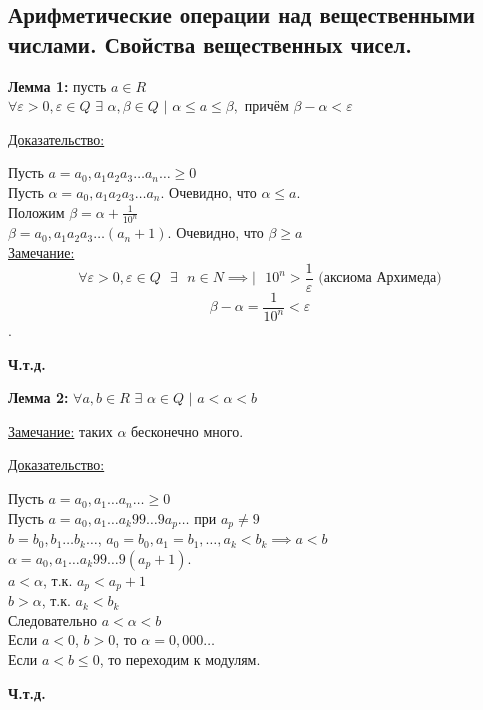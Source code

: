 \documentclass[12pt]{article}
\begin{document}
    \subsection{Арифметические операции над вещественными числами. Свойства вещественных чисел.}\noindent
    \textbf{Лемма 1:} пусть $a \in R$\\
    $\forall \varepsilon > 0, \varepsilon \in Q$ $\exists$ $\alpha, \beta \in Q$ $|$ $\alpha \le a \le \beta,$ причём $\beta - \alpha < \varepsilon$\par\noindent
    \underline{Доказательство:}
    \begin{adjustwidth}{1.5em}{1.5em}
        Пусть $a = a_{0},a_{1}a_{2}a_{3}\dots a_{n}\dots \ge 0$\\
        Пусть $\alpha = a_{0},a_{1}a_{2}a_{3}\dots a_{n}.$ Очевидно, что $\alpha \le a$.\\
        Положим $\beta = \alpha + \frac{1}{10^n}$\\
        $\beta = a_{0},a_{1}a_{2}a_{3}\dots (a_{n}+1)$. Очевидно, что $\beta \ge a$\\
        \underline{Замечание:} \[\forall \varepsilon > 0, \varepsilon \in Q \text{ } \exists \text{ } n \in N \implies | \text{ } 10^n > \frac{1}{\varepsilon} \text{ (аксиома Архимеда)}\]
        \[\beta - \alpha = \frac{1}{10^n} < \varepsilon\].
        \begin{center}
            \textbf{Ч.т.д.}
        \end{center}    
    \end{adjustwidth}

    \noindent \textbf{Лемма 2:} $\forall a,b \in R$ $\exists$ $\alpha \in Q$ $|$ $a < \alpha < b$\par\noindent
    \underline{Замечание:} таких $\alpha$ бесконечно много.\par\noindent
    \underline{Доказательство:} 
    \begin{adjustwidth}{1.5em}{1.5em}
        Пусть $a = a_{0},a_{1}\dots a_{n}\dots \ge 0$\\
        Пусть $a = a_{0},a_{1}\dots a_{k}99\dots9a_{p}\dots$ при $a_{p} \ne 9$\\
        $b = b_{0},b_{1}\dots b_{k}\dots$, $a_{0}=b_{0}, a_{1} = b_{1}, \dots, a_{k} < b_{k} \implies a < b$\\
        $\alpha = a_{0},a_{1}\dots a_{k}99\dots9(a_{p}+1)$.\\
        $a < \alpha$, т.к. $a_{p} < a_{p} + 1$\\
        $b > \alpha$, т.к. $a_{k} < b_{k}$\\
        Следовательно $a < \alpha < b$\\
        Если $a < 0$, $b > 0$, то $\alpha = 0,000\dots$\\
        Если $a < b \le 0$, то переходим к модулям.
        \begin{center}
            \textbf{Ч.т.д.}
        \end{center}
    \end{adjustwidth}
\end{document}
